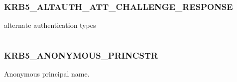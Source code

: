 \documentclass[letterpaper,10pt,english]{sphinxmanual}
\begin{document}
\subsubsection{KRB5\_ALTAUTH\_ATT\_CHALLENGE\_RESPONSE}
\label{appdev/refs/macros/KRB5_ALTAUTH_ATT_CHALLENGE_RESPONSE:krb5-altauth-att-challenge-response}\label{appdev/refs/macros/KRB5_ALTAUTH_ATT_CHALLENGE_RESPONSE:krb5-altauth-att-challenge-response-data}\label{appdev/refs/macros/KRB5_ALTAUTH_ATT_CHALLENGE_RESPONSE::doc}

\begin{fulllineitems}
\label{appdev/refs/macros/KRB5_ALTAUTH_ATT_CHALLENGE_RESPONSE:KRB5_ALTAUTH_ATT_CHALLENGE_RESPONSE}
\end{fulllineitems}


alternate authentication types

\begin{tabulary}{\linewidth}{|L|L|}
\hline

 & 
\\\hline
\end{tabulary}



\subsubsection{KRB5\_ANONYMOUS\_PRINCSTR}
\label{appdev/refs/macros/KRB5_ANONYMOUS_PRINCSTR:krb5-anonymous-princstr}\label{appdev/refs/macros/KRB5_ANONYMOUS_PRINCSTR:krb5-anonymous-princstr-data}\label{appdev/refs/macros/KRB5_ANONYMOUS_PRINCSTR::doc}

\begin{fulllineitems}
\label{appdev/refs/macros/KRB5_ANONYMOUS_PRINCSTR:KRB5_ANONYMOUS_PRINCSTR}
\end{fulllineitems}


Anonymous principal name.

\begin{tabulary}{\linewidth}{|L|L|}
\hline

 & 
\\\hline
\end{tabulary}
\end{document}
